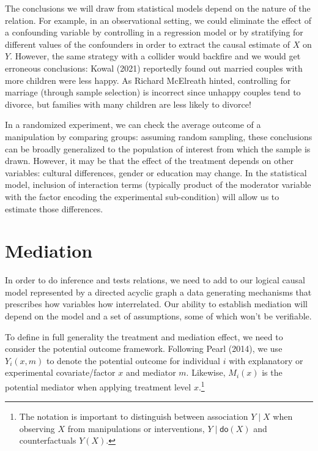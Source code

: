 \documentclass[
  11pt,
  letterpaper,
]{scrbook}
\theoremstyle{definition}
\theoremstyle{remark}
\begin{document}
The conclusions we will draw from statistical models depend on the
nature of the relation. For example, in an observational setting, we
could eliminate the effect of a confounding variable by controlling in a
regression model or by stratifying for different values of the
confounders in order to extract the causal estimate of \(X\) on \(Y\).
However, the same strategy with a collider would backfire and we would
get erroneous conclusions: Kowal (2021) reportedly found out married
couples with more children were less happy. As Richard McElreath hinted,
controlling for marriage (through sample selection) is incorrect since
unhappy couples tend to divorce, but families with many children are
less likely to divorce!

In a randomized experiment, we can check the average outcome of a
manipulation by comparing groups: assuming random sampling, these
conclusions can be broadly generalized to the population of interest
from which the sample is drawn. However, it may be that the effect of
the treatment depends on other variables: cultural differences, gender
or education may change. In the statistical model, inclusion of
interaction terms (typically product of the moderator variable with the
factor encoding the experimental sub-condition) will allow us to
estimate those differences.

\hypertarget{mediation}{%
\section{Mediation}\label{mediation}}

In order to do inference and tests relations, we need to add to our
logical causal model represented by a directed acyclic graph a data
generating mechanisms that prescribes how variables how interrelated.
Our ability to establish mediation will depend on the model and a set of
assumptions, some of which won't be verifiable.

To define in full generality the treatment and mediation effect, we need
to consider the potential outcome framework. Following Pearl (2014), we
use \(Y_i(x, m)\) to denote the potential outcome for individual \(i\)
with explanatory or experimental covariate/factor \(x\) and mediator
\(m\). Likewise, \(M_i(x)\) is the potential mediator when applying
treatment level \(x\).\footnote{The notation is important to distinguish
  between association \(Y \mid X\) when observing \(X\) from
  manipulations or interventions, \(Y \mid \mathsf{do}(X)\) and
  counterfactuals \(Y(X)\).}
\end{document}
